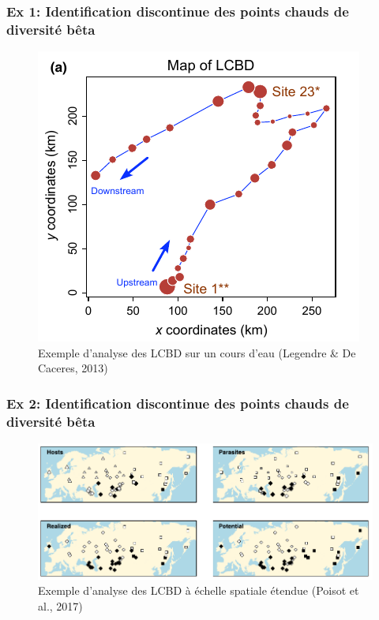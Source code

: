 \documentclass[10pt]{beamer}
\begin{document}
\begin{frame}
  \frametitle{Ex 1: Identification discontinue des points chauds de diversité bêta}
  \begin{figure}
    \centering
    \hspace*{-0cm}\includegraphics[scale=0.5]{fig/lcbd_LegeDeCa2013.png}
    \caption{Exemple d'analyse des LCBD sur un cours d'eau (Legendre \& De Caceres, 2013)}
  \end{figure}
\end{frame}

\begin{frame}
  \frametitle{Ex 2: Identification discontinue des points chauds de diversité bêta}
  \begin{figure}
    \centering
    \hspace*{-0cm}\includegraphics[scale=0.35]{fig/lcbd_Pois2017.png}
    \caption{Exemple d'analyse des LCBD à échelle spatiale étendue (Poisot et al., 2017)}
  \end{figure}
\end{frame}
\end{document}
